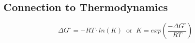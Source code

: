 \subsection{Connection to Thermodynamics}
    $$
      \Delta G^\circ = - R T \cdot ln(K) \;\; \textrm{or} \;\; K = exp(\frac{-\Delta G^\circ}{R T})  
    $$